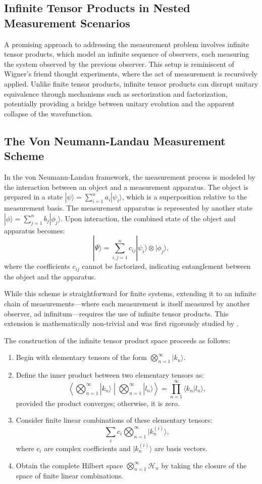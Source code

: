 \documentclass[shortAfour,sageh,times]{sagej}
\begin{document}
\subsection{Infinite Tensor Products in Nested Measurement Scenarios}

A promising approach to addressing the measurement problem involves infinite tensor products, which model an infinite sequence of observers, each measuring the system observed by the previous observer. This setup is reminiscent of Wigner's friend thought experiments, where the act of measurement is recursively applied. Unlike finite tensor products, infinite tensor products can disrupt unitary equivalence through mechanisms such as sectorization and factorization, potentially providing a bridge between unitary evolution and the apparent collapse of the wavefunction.

\subsection{The Von Neumann-Landau Measurement Scheme}

In the von Neumann-Landau framework, the measurement process is modeled by the interaction between an object and a measurement apparatus. The object is prepared in a state $|\psi\rangle = \sum_{i=1}^n a_i |\psi_i\rangle$, which is a superposition relative to the measurement basis. The measurement apparatus is represented by another state $|\phi\rangle = \sum_{j=1}^n b_j |\phi_j\rangle$. Upon interaction, the combined state of the object and apparatus becomes:
\[
|\Psi\rangle = \sum_{i,j=1}^n c_{ij} |\psi_i\rangle \otimes |\phi_j\rangle,
\]
where the coefficients $c_{ij}$ cannot be factorized, indicating entanglement between the object and the apparatus.

While this scheme is straightforward for finite systems, extending it to an infinite chain of measurements---where each measurement is itself measured by another observer, ad infinitum---requires the use of infinite tensor products. This extension is mathematically non-trivial and was first rigorously studied by \cite{vonNeumann1939}.

The construction of the infinite tensor product space proceeds as follows:
\begin{enumerate}
    \item Begin with elementary tensors of the form $\bigotimes_{n=1}^{\infty} |k_n\rangle$.
    \item Define the inner product between two elementary tensors as:
    \[
    \left\langle \bigotimes_{n=1}^{\infty} |k_n\rangle \middle| \bigotimes_{n=1}^{\infty} |l_n\rangle \right\rangle = \prod_{n=1}^{\infty} \langle k_n | l_n \rangle,
    \]
    provided the product converges; otherwise, it is zero.
    \item Consider finite linear combinations of these elementary tensors:
    \[
    \sum_i c_i \bigotimes_{n=1}^{\infty} |k_n^{(i)}\rangle,
    \]
    where $c_i$ are complex coefficients and $|k_n^{(i)}\rangle$ are basis vectors.
    \item Obtain the complete Hilbert space $\bigotimes_{n=1}^{\infty} \mathcal{H}_n$ by taking the closure of the space of finite linear combinations.
\end{enumerate}
\end{document}
